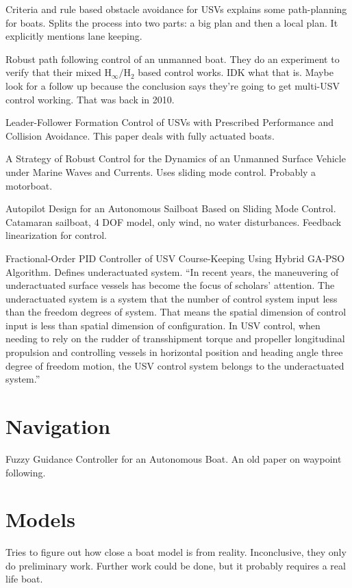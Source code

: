 \documentclass[conference]{IEEEtran}
\begin{document}
\cite{Tan2010} Criteria and rule based obstacle avoidance for USVs explains some path-planning for boats. Splits the process into two parts: a big plan and then a local plan. It explicitly mentions lane keeping.

\cite{Yu2010} Robust path following control of an unmanned boat. They do an experiment to verify that their mixed \(\mathrm{H}_\infty / \mathrm{H}_2\) based control works. IDK what that is. Maybe look for a follow up because the conclusion says they're going to get multi-USV control working. That was back in 2010.

\cite{Dai2017} Leader-Follower Formation Control of USVs with Prescribed Performance and Collision Avoidance. This paper deals with fully actuated boats.

\cite{Velueta2019} A Strategy of Robust Control for the Dynamics of an Unmanned Surface Vehicle under Marine Waves and Currents. Uses sliding mode control. Probably a motorboat. 

\cite{HelmiAbrougui2019} Autopilot Design for an Autonomous Sailboat Based on Sliding Mode Control. Catamaran sailboat, 4 DOF model, only wind, no water disturbances. Feedback linearization for control.

\cite{Li2016} Fractional-Order PID Controller of USV Course-Keeping Using Hybrid GA-PSO Algorithm. Defines underactuated system. \enquote{In recent years, the maneuvering of underactuated surface vessels has become the focus of scholars’ attention. The underactuated system is a system that the number of control system input less than the freedom degrees of system. That means the spatial dimension of control input is less than spatial dimension of configuration. In USV control, when needing to rely on the rudder of transshipment torque and propeller longitudinal propulsion and controlling vessels in horizontal position and heading angle three degree of freedom motion, the USV control system belongs to the underactuated system.}



\cite{}


\section{Navigation}
\cite{Vaneck1997} Fuzzy Guidance Controller for an Autonomous Boat. An old paper on waypoint following.

 

\section{Models}
\cite{Huang2017} Tries to figure out how close a boat model is from reality. Inconclusive, they only do preliminary work. Further work could be done, but it probably requires a real life boat.
\end{document}
